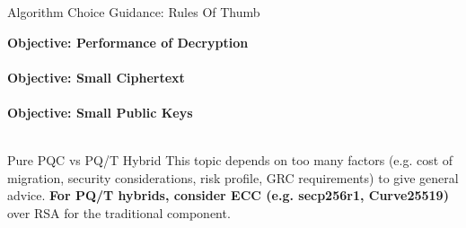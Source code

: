 \documentclass[11pt,english,a4paper, landscape]{scrartcl}
\begin{document}
\begin{minipage}[t]{0.7\textwidth}
\begin{algorithmbox}{Algorithm Choice Guidance: Rules Of Thumb}
\begin{minipage}[t]{0.5\textwidth}
				{\scriptsize \bfseries Objective: Performance of Decryption \tbv}\\[0.1\baselineskip]
				\\[0.75\baselineskip]
				{\scriptsize \bfseries Objective: Small Ciphertext \tbv}\\[0.1\baselineskip]
				\\[0.75\baselineskip]
				{\scriptsize \bfseries Objective: Small Public Keys \tbv}\\[0.1\baselineskip]
				\\[0.75\baselineskip]
			\end{minipage}
		\end{algorithmbox}
		\begin{algorithmbox}{Pure PQC vs PQ/T Hybrid}
			\scriptsize
			This topic depends on too many factors (e.g. cost of migration, security considerations, risk profile, GRC requirements) to give general advice. {\bfseries For PQ/T hybrids, consider  ECC (e.g. secp256r1, Curve25519)} over RSA for the traditional component.
			\vspace{-1mm}
		\end{algorithmbox}
	\end{minipage}
\end{document}
